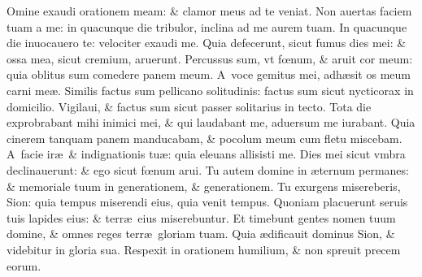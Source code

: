 \documentclass[a5paper,10pt]{book}
\def\ae{æ}
\def\oe{œ}
\begin{document}
\begin{multicols*}{2}
\vspace{-1.25em}
Omine exaudi orationem meam: \& clamor meus ad te veniat.
\newline \color{red} N\color{black}on auertas faciem tuam a me: in quacunque die tribulor, inclina ad me aurem tuam.
\newline \color{red} I\color{black}n quacunque die inuocauero te: velociter exaudi me.
\newline \color{red} Q\color{black}uia defecerunt, sicut fumus dies mei: \& ossa mea, sicut cremium, aruerunt.
\newline \color{red} P\color{black}ercussus sum, vt f\oe num, \& aruit cor meum: quia oblitus sum comedere panem meum.
\newline \color{red} A\color{black}\ voce gemitus mei, adh\ae sit os meum carni me\ae .
\newline \color{red} S\color{black}imilis factus sum pellicano solitudinis: factus sum sicut nycticorax in domicilio.
\newline \color{red} V\color{black}igilaui, \& factus sum sicut passer solitarius in tecto.
\newline \color{red} T\color{black}ota die exprobrabant mihi inimici mei, \& qui laudabant me, aduersum me iurabant.
\newline \color{red} Q\color{black}uia cinerem tanquam panem manducabam, \& pocolum meum cum fletu miscebam.%
\newline \color{red} A\color{black}\ facie ir\ae \ \& indignationis tu\ae : quia eleuans allisisti me.
\newline \color{red} D\color{black}ies mei sicut vmbra declinauerunt: \& ego sicut f\oe num arui.
\newline \color{red} T\color{black}u autem domine in \ae ternum permanes: \& memoriale tuum in generationem, \& generationem.
\newline \color{red} T\color{black}u exurgens misereberis, Sion: quia tempus miserendi eius, quia venit tempus.
\newline \color{red} Q\color{black}uoniam placuerunt seruis tuis lapides eius: \& terr\ae \ eius miserebuntur.
\newline \color{red} E\color{black}t timebunt gentes nomen tuum domine, \& omnes reges terr\ae \ gloriam tuam.
\newline \color{red} Q\color{black}uia \ae dificauit dominus Sion, \& videbitur in gloria sua.
\newline \color{red} R\color{black}espexit in orationem humilium, \& non spreuit precem eorum.

\end{multicols*}
\end{document}

